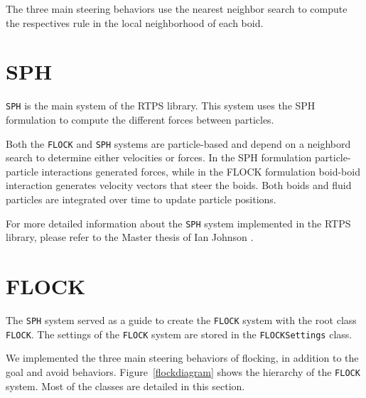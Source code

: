 The three main steering behaviors  
use the nearest neighbor search to compute the respectives rule in the 
local neighborhood of each boid.

\section{SPH}\label{sphsection}
\texttt{SPH} is the main system of the RTPS library.  This system uses the SPH formulation to compute the different forces between particles.

Both the \texttt{FLOCK} and \texttt{SPH} systems are particle-based and depend on a neighbord search to determine either velocities or forces. 
In the SPH formulation particle-particle interactions generated forces, 
while in the FLOCK formulation boid-boid interaction generates velocity 
vectors that steer the boids.
Both boids and fluid particles are   integrated over time to update particle positions.

For more detailed information about the \texttt{SPH} system implemented in the RTPS library, please refer to the Master thesis of Ian Johnson \cite{ianThesis}.

\section{FLOCK}\label{flocksection}
The \texttt{SPH} system served as a guide to create the 
\texttt{FLOCK} system with  the root class \texttt{FLOCK}.  
  
The settings of the \texttt{FLOCK} system are 
stored in the \texttt{FLOCKSettings} class. 

We implemented the three main steering behaviors of flocking, 
in addition to the goal 
and avoid behaviors. Figure~\ref{flockdiagram} shows 
the hierarchy of the \texttt{FLOCK} system. Most of the classes are detailed 
in this section. 
 

